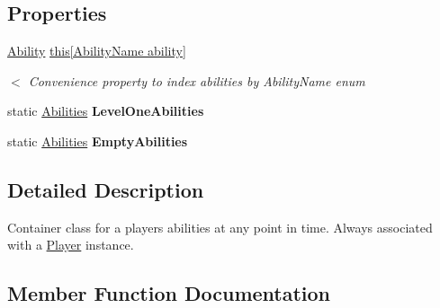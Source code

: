 \subsection*{Properties}
\begin{DoxyCompactItemize}
\item 
\hyperlink{class_assets_1_1_scripts_1_1_ability}{Ability} \hyperlink{class_assets_1_1_scripts_1_1_abilities_a77ef9775a69b65589bedf6c0ac34dced}{this\mbox{[}\+Ability\+Name ability\mbox{]}}\hypertarget{class_assets_1_1_scripts_1_1_abilities_a77ef9775a69b65589bedf6c0ac34dced}{}\label{class_assets_1_1_scripts_1_1_abilities_a77ef9775a69b65589bedf6c0ac34dced}

\begin{DoxyCompactList}\small\item\em $<$ Convenience property to index abilities by Ability\+Name enum \end{DoxyCompactList}\item 
static \hyperlink{class_assets_1_1_scripts_1_1_abilities}{Abilities} {\bfseries Level\+One\+Abilities}\hypertarget{class_assets_1_1_scripts_1_1_abilities_a5ca60f173cdb3c7826c48e2252169d82}{}\label{class_assets_1_1_scripts_1_1_abilities_a5ca60f173cdb3c7826c48e2252169d82}

\item 
static \hyperlink{class_assets_1_1_scripts_1_1_abilities}{Abilities} {\bfseries Empty\+Abilities}\hypertarget{class_assets_1_1_scripts_1_1_abilities_a657aaff831b21590f11b0ebc493cdc51}{}\label{class_assets_1_1_scripts_1_1_abilities_a657aaff831b21590f11b0ebc493cdc51}

\end{DoxyCompactItemize}


\subsection{Detailed Description}
Container class for a player\textquotesingle{}s abilities at any point in time. Always associated with a \hyperlink{class_assets_1_1_scripts_1_1_player}{Player} instance. 



\subsection{Member Function Documentation}

